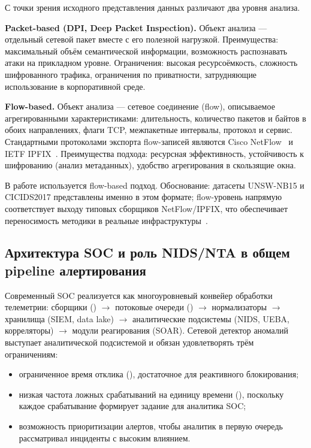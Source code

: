 С точки зрения исходного представления данных различают два уровня анализа.

\textbf{Packet-based (DPI, Deep Packet Inspection).} Объект анализа --- отдельный
сетевой пакет вместе с его полезной нагрузкой. Преимущества: максимальный объём
семантической информации, возможность распознавать атаки на прикладном уровне.
Ограничения: высокая ресурсоёмкость, сложность шифрованного трафика, ограничения
по приватности, затрудняющие использование в корпоративной среде.

\textbf{Flow-based.} Объект анализа --- сетевое соединение (flow), описываемое
агрегированными характеристиками: длительность, количество пакетов и байтов в
обоих направлениях, флаги TCP, межпакетные интервалы, протокол и сервис.
Стандартными протоколами экспорта flow-записей являются Cisco
NetFlow~\cite{rfc3954} и IETF IPFIX~\cite{rfc7011}. Преимущества подхода:
ресурсная эффективность, устойчивость к шифрованию (анализ метаданных), удобство
агрегирования в скользящие окна.

В работе используется flow-based подход. Обоснование: датасеты UNSW-NB15 и
CICIDS2017 представлены именно в этом формате; flow-уровень напрямую
соответствует выходу типовых сборщиков NetFlow/IPFIX, что обеспечивает
переносимость методики в реальные инфраструктуры~\cite{moustafa2015unsw,
sharafaldin2018toward, gharib2016evalframework}.

\subsection{Архитектура SOC и роль NIDS/NTA в общем pipeline алертирования}
\label{subsec:soc-integration}

Современный SOC реализуется как многоуровневый конвейер обработки телеметрии:
сборщики () $\rightarrow$ потоковые
очереди () $\rightarrow$ нормализаторы $\rightarrow$ хранилища
(SIEM, data lake) $\rightarrow$ аналитические подсистемы (NIDS, UEBA, корреляторы)
$\rightarrow$ модули реагирования (SOAR). Сетевой детектор аномалий выступает
аналитической подсистемой и обязан удовлетворять трём ограничениям:

\begin{itemize}
    \item ограниченное время отклика (), достаточное для
    реактивного блокирования;
    \item низкая частота ложных срабатываний на единицу времени
    (), поскольку каждое срабатывание формирует
    задание для аналитика SOC;
    \item возможность приоритизации алертов, чтобы аналитик в первую очередь
    рассматривал инциденты с высоким влиянием.
\end{itemize}

